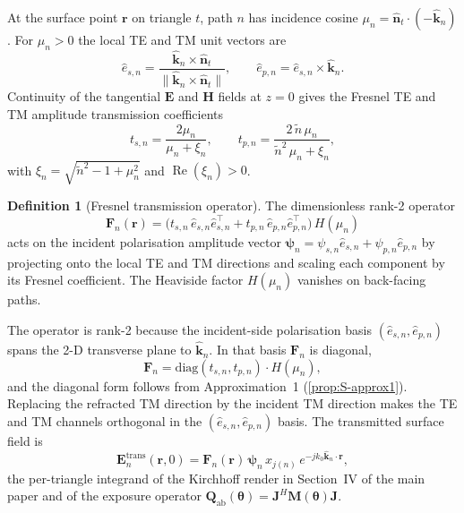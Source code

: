 \documentclass[10pt,journal,twocolumn]{IEEEtran}
\newcommand{\rr}{\bm{r}}
\newcommand{\nhat}{\hat{\bm{n}}}
\newcommand{\khat}{\hat{\bm{k}}}
\newcommand{\Qabs}{\mathbf{Q}_{\mathrm{ab}}}
\newcommand{\Jmat}{\mathbf{J}}
\newcommand{\Fn}{\mathbf{F}_n}
\newcommand{\psin}{\bm{\psi}_n}
\newcommand{\thetab}{\bm{\theta}}
\newcommand{\ntilde}{\tilde{n}}
\DeclareMathOperator{\RE}{Re}
\theoremstyle{plain}
\theoremstyle{definition}
\newtheorem{definition}[proposition]{Definition}
\begin{document}
At the surface point $\rr$ on triangle $t$, path $n$ has incidence
cosine $\mu_n = \nhat_t \cdot (-\khat_n)$. For $\mu_n > 0$ the local
TE and TM unit vectors are
\begin{equation}\label{eq:S-TE-TM-basis}
  \hat{e}_{s,n} = \frac{\khat_n \times \nhat_t}
                       {\|\khat_n \times \nhat_t\|},
  \qquad
  \hat{e}_{p,n} = \hat{e}_{s,n} \times \khat_n.
\end{equation}
Continuity of the tangential $\bm{E}$ and $\bm{H}$ fields at $z=0$
gives the Fresnel TE and TM amplitude transmission coefficients
\begin{equation}\label{eq:S-fresnel-t}
  t_{s,n} = \frac{2 \mu_n}{\mu_n + \xi_n},
  \qquad
  t_{p,n} = \frac{2\,\ntilde\,\mu_n}{\ntilde^2\,\mu_n + \xi_n},
\end{equation}
with $\xi_n = \sqrt{\ntilde^2 - 1 + \mu_n^2}$ and $\RE(\xi_n) > 0$.

\begin{definition}[Fresnel transmission operator]\label{def:S-Fn}
The dimensionless rank-2 operator
\begin{equation}\label{eq:S-Fn-def}
  \Fn(\rr) =
  \bigl(t_{s,n}\,\hat{e}_{s,n}\hat{e}_{s,n}^{\!\top}
      + t_{p,n}\,\hat{e}_{p,n}\hat{e}_{p,n}^{\!\top}\bigr)\,H(\mu_n)
\end{equation}
acts on the incident polarisation amplitude vector
$\psin = \psi_{s,n}\hat{e}_{s,n} + \psi_{p,n}\hat{e}_{p,n}$ by
projecting onto the local TE and TM directions and scaling each
component by its Fresnel coefficient. The Heaviside factor
$H(\mu_n)$ vanishes on back-facing paths.
\end{definition}

The operator is rank-2 because the incident-side polarisation basis
$(\hat{e}_{s,n}, \hat{e}_{p,n})$ spans the 2-D transverse plane to
$\khat_n$. In that basis $\Fn$ is diagonal,
\begin{equation}\label{eq:S-Fn-diag}
  \Fn = \mathrm{diag}(t_{s,n}, t_{p,n}) \cdot H(\mu_n),
\end{equation}
and the diagonal form follows from Approximation~1
(\cref{prop:S-approx1}). Replacing the refracted TM direction by the
incident TM direction makes the TE and TM channels orthogonal in the
$(\hat{e}_{s,n}, \hat{e}_{p,n})$ basis. The transmitted surface
field is
\begin{equation}\label{eq:S-Etrans}
  \bm{E}_n^{\mathrm{trans}}(\rr, 0)
    = \Fn(\rr)\,\psin\,x_{j(n)}\,e^{-jk_0\khat_n\cdot\rr},
\end{equation}
the per-triangle integrand of the Kirchhoff render in Section~IV of
the main paper and of the exposure operator
$\Qabs(\thetab) = \Jmat^{H}\mathbf{M}(\thetab)\Jmat$.
\end{document}
